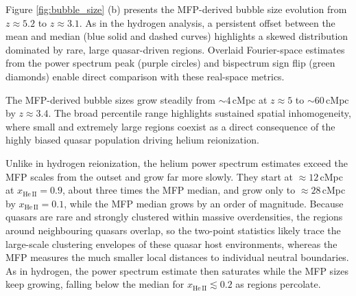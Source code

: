 \documentclass[apj,twocolumn, appendixfloats, twocolappendix, numberedappendix, tighten]{openjournal}
\begin{document}
Figure \ref{fig:bubble_size} (b) presents the MFP-derived  bubble size evolution from $z \approx 5.2$ to $z \approx 3.1$. As in the hydrogen analysis, a persistent offset between the mean and median (blue solid and dashed curves) highlights a skewed distribution dominated by rare, large quasar-driven regions. Overlaid Fourier-space estimates from the power spectrum peak (purple circles) and bispectrum sign flip (green diamonds) enable direct comparison with these real-space metrics.



The MFP-derived bubble sizes grow steadily from $\sim 4$\,cMpc at $z \approx 5$ to $\sim 60$\,cMpc by $z \approx 3.4$. The broad percentile range highlights sustained spatial inhomogeneity, where small and extremely large  regions coexist as a direct consequence of the highly biased quasar population driving helium reionization.


Unlike in hydrogen reionization, the helium power spectrum estimates exceed the MFP scales from the outset and grow far more slowly. They start at $\approx 12$\,cMpc at $x_\mathrm{He\,II} = 0.9$, about three times the MFP median, and grow only to $\approx 28$\,cMpc by $x_\mathrm{He\,II} = 0.1$, while the MFP median grows by an order of magnitude. Because quasars are rare and strongly clustered within massive overdensities, the  regions around neighbouring quasars overlap, so the two-point statistics likely trace the large-scale clustering envelopes of these quasar host environments, whereas the MFP measures the much smaller local distances to individual neutral boundaries. As in hydrogen, the power spectrum estimate then saturates while the MFP sizes keep growing, falling below the median for $x_\mathrm{He\,II} \lesssim 0.2$ as  regions percolate.
\end{document}
